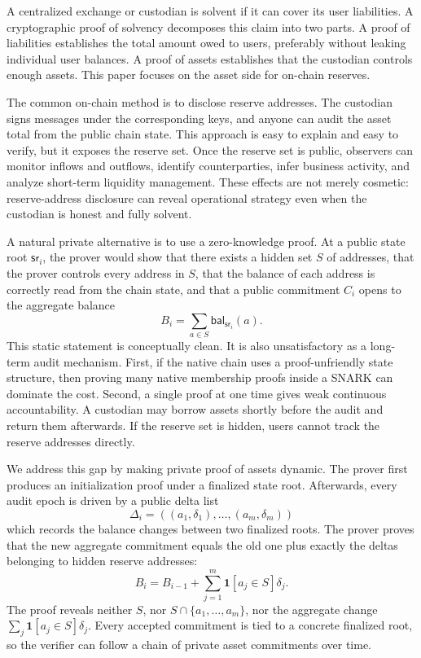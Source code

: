 \documentclass[runningheads]{llncs}
\newcommand{\bal}{\mathsf{bal}}
\newcommand{\sr}{\mathsf{sr}}
\newcommand{\dlist}{\Delta}
\begin{document}
A centralized exchange or custodian is solvent if it can cover its user liabilities.  A cryptographic proof of solvency decomposes this claim into two parts.  A proof of liabilities establishes the total amount owed to users, preferably without leaking individual user balances.  A proof of assets establishes that the custodian controls enough assets.  This paper focuses on the asset side for on-chain reserves.

The common on-chain method is to disclose reserve addresses.  The custodian signs messages under the corresponding keys, and anyone can audit the asset total from the public chain state.  This approach is easy to explain and easy to verify, but it exposes the reserve set.  Once the reserve set is public, observers can monitor inflows and outflows, identify counterparties, infer business activity, and analyze short-term liquidity management.  These effects are not merely cosmetic: reserve-address disclosure can reveal operational strategy even when the custodian is honest and fully solvent.

A natural private alternative is to use a zero-knowledge proof.  At a public state root \(\sr_i\), the prover would show that there exists a hidden set \(S\) of addresses, that the prover controls every address in \(S\), that the balance of each address is correctly read from the chain state, and that a public commitment \(C_i\) opens to the aggregate balance
\[
        B_i=\sum_{a\in S}\bal_{\sr_i}(a).
\]
This static statement is conceptually clean.  It is also unsatisfactory as a long-term audit mechanism.  First, if the native chain uses a proof-unfriendly state structure, then proving many native membership proofs inside a SNARK can dominate the cost.  Second, a single proof at one time gives weak continuous accountability.  A custodian may borrow assets shortly before the audit and return them afterwards.  If the reserve set is hidden, users cannot track the reserve addresses directly.

We address this gap by making private proof of assets dynamic.  The prover first produces an initialization proof under a finalized state root.  Afterwards, every audit epoch is driven by a public delta list
\[
        \dlist_i=((a_1,\delta_1),\ldots,(a_m,\delta_m))
\]
which records the balance changes between two finalized roots.  The prover proves that the new aggregate commitment equals the old one plus exactly the deltas belonging to hidden reserve addresses:
\[
        B_i = B_{i-1}+\sum_{j=1}^m \mathbf{1}[a_j\in S]\delta_j.
\]
The proof reveals neither \(S\), nor \(S\cap\{a_1,\ldots,a_m\}\), nor the aggregate change \(\sum_j \mathbf{1}[a_j\in S]\delta_j\).  Every accepted commitment is tied to a concrete finalized root, so the verifier can follow a chain of private asset commitments over time.
\end{document}
